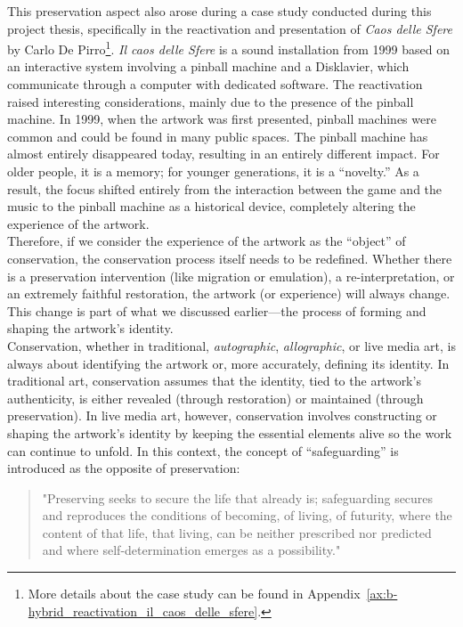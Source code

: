 This preservation aspect also arose during a case study conducted during this project thesis, specifically in the reactivation and presentation of \textit{Caos delle Sfere} by Carlo De Pirro\footnote{More details about the case study can be found in Appendix~\ref{ax:b-hybrid_reactivation_il_caos_delle_sfere}.}. \textit{Il caos delle Sfere} is a sound installation from 1999 based on an interactive system involving a pinball machine and a Disklavier, which communicate through a computer with dedicated software. The reactivation raised interesting considerations, mainly due to the presence of the pinball machine. In 1999, when the artwork was first presented, pinball machines were common and could be found in many public spaces. The pinball machine has almost entirely disappeared today, resulting in an entirely different impact. For older people, it is a memory; for younger generations, it is a ``novelty.'' As a result, the focus shifted entirely from the interaction between the game and the music to the pinball machine as a historical device, completely altering the experience of the artwork.\\
Therefore, if we consider the experience of the artwork as the ``object'' of conservation, the conservation process itself needs to be redefined. Whether there is a preservation intervention (like migration or emulation), a re-interpretation, or an extremely faithful restoration, the artwork (or experience) will always change. This change is part of what we discussed earlier—the process of forming and shaping the artwork’s identity.\\
Conservation, whether in traditional, \textit{autographic}, \textit{allographic}, or live media art, is always about identifying the artwork or, more accurately, defining its identity. In traditional art, conservation assumes that the identity, tied to the artwork’s authenticity, is either revealed (through restoration) or maintained (through preservation). In live media art, however, conservation involves constructing or shaping the artwork’s identity by keeping the essential elements alive so the work can continue to unfold.
In this context, the concept of ``safeguarding'' \cite{butler2018my, castriota2019authenticity} is introduced as the opposite of preservation:
\begin{quote}
    "Preserving seeks to secure the life that already is; safeguarding secures and reproduces the conditions of becoming, of living, of futurity, where the content of that life, that living, can be neither prescribed nor predicted and where self-determination emerges as a possibility." \cite{butler2018my} 
\end{quote}
